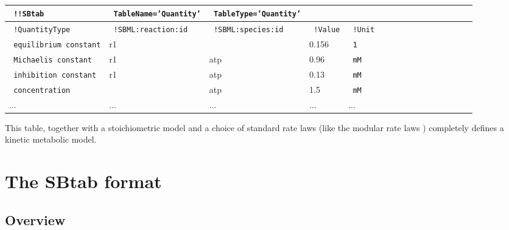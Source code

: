 \documentclass[a4paper]{article}
\newcommand{\tab}[1]{{\texttt{\color{red} #1}}}
\newcommand{\col}[1]{\texttt{\color{blue} #1}}
\newcommand{\defext}[1] {\texttt{\color{lightblue} #1}}
\newcommand{\defint}[1] {\texttt{\color{darkgreen} #1}}
\begin{document}
\begin{center} {\tt \small
    \begin{tabular}{|l|l|l|l|l|l|l|l|l|l|l|l|l|l|ll}
      \hline 
      \tab{!!SBtab} & \tab{TableName='Quantity'} & \tab{TableType='Quantity'} & & \\
      \hline\hline
      \col{!QuantityType} &  \col{!SBML:reaction:id} & \col{!SBML:species:id} &\defint{!Value} &\col{!Unit} \\ \hline
      \defext{equilibrium constant}      &  r1 &        & 0.156 & \defext{1 }\\ \hline
      \defext{Michaelis constant}        &  r1 & atp & 0.96  & \defext{mM}\\ \hline
      \defext{inhibition constant}       &  r1 & atp & 0.13  & \defext{mM}\\ \hline
      \defext{concentration}             &         & atp & 1.5 & \defext{mM}\\ \hline
  ... &   ... &   ... &   ... & ...   \\ \hline
\end{tabular}
}
\end{center}

This table, together with a stoichiometric model and a choice of
standard rate laws (like the modular rate laws \cite{liuk:10})
completely defines a kinetic metabolic model.


\section{The SBtab format}
\label{chapter2}

\subsection{Overview}
\end{document}
